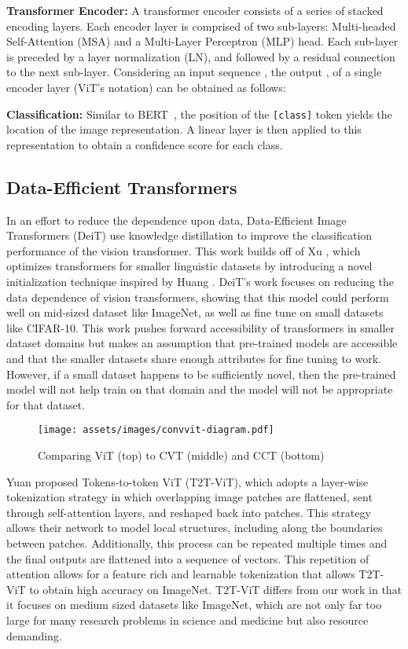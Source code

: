 \documentclass[10pt,twocolumn,letterpaper]{article}
\begin{document}
\textbf{Transformer Encoder:}
A transformer encoder consists of a series of stacked encoding layers. Each encoder layer is comprised of two sub-layers: Multi-headed Self-Attention (MSA) and a Multi-Layer Perceptron (MLP) head. Each sub-layer is preceded by a layer normalization (LN), and followed by a residual connection to the next sub-layer. Considering an input sequence , the output , of a single encoder layer (ViT's notation) can be obtained as follows:



\textbf{Classification:}
Similar to BERT~\cite{devlin2019bert}, the position of the \verb|[class]| token yields the location of the image representation. A linear layer is then applied to this representation to obtain a confidence score for each class.

\subsection{Data-Efficient Transformers}

In an effort to reduce the dependence upon data, Data-Efficient Image Transformers (DeiT) \cite{touvron2020training} use knowledge distillation to improve the classification performance of the vision transformer. 
This work builds off of Xu \etal \cite{xu2020optimizing}, which optimizes transformers for smaller linguistic datasets by introducing a novel initialization technique inspired by Huang \etal \cite{huang2020improving}. 
DeiT's work focuses on reducing the data dependence of vision transformers, showing that this model could perform well on mid-sized dataset like ImageNet, as well as fine tune on small datasets like CIFAR-10.
This work pushes forward accessibility of transformers in smaller dataset domains but makes an assumption that pre-trained models are accessible and that the smaller datasets share enough attributes for fine tuning to work. 
However, if a small dataset happens to be sufficiently novel, then the pre-trained model will not help train on that domain and the model will not be appropriate for that dataset.

\begin{figure*}[ht!]
    \centering
    \texttt{[image: assets/images/convvit-diagram.pdf]}
    \caption{Comparing ViT (top) to CVT (middle) and CCT (bottom)}
    \label{fig:vit_comparison}
\end{figure*}

Yuan \etal \cite{yuan2021tokens} proposed Tokens-to-token ViT (T2T-ViT), which adopts a layer-wise tokenization strategy in which overlapping image patches are flattened, sent through self-attention layers, and reshaped back into patches. 
This strategy allows their network to model local structures, including along the boundaries between patches.
Additionally, this process can be repeated multiple times and the final outputs are flattened into a sequence of vectors.
This repetition of attention allows for a feature rich and learnable tokenization that allows T2T-ViT to obtain high accuracy on ImageNet. 
T2T-ViT differs from our work in that it focuses on medium sized datasets like ImageNet, which are not only far too large for many research problems in science and medicine but also resource demanding.
\end{document}
